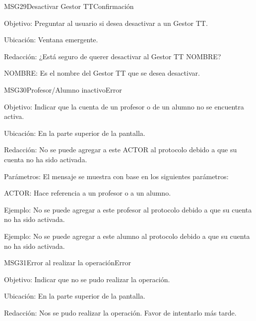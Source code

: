 \begin{mensaje}{MSG29}{Desactivar Gestor TT}{Confirmación}
	\item[Objetivo:] Preguntar al usuario si desea desactivar a un Gestor TT.
    \item[Ubicación:] Ventana emergente.
    \item[Redacción:] ¿Está seguro de querer desactivar al Gestor TT NOMBRE?
    \begin{Citemize}
	   	\item NOMBRE: Es el nombre del Gestor TT que se desea desactivar.
	\end{Citemize}
\end{mensaje}

\begin{mensaje}{MSG30}{Profesor/Alumno inactivo}{Error}
	\item[Objetivo:] Indicar que la cuenta de un profesor o de un alumno no se encuentra activa.
	\item[Ubicación:] En la parte superior de la pantalla.
	\item[Redacción:] No se puede agregar a este ACTOR al protocolo debido a que su cuenta no ha sido activada.
	\item[Parámetros:] El mensaje se muestra con base en los siguientes parámetros:
	\begin{Citemize}
		\item ACTOR: Hace referencia a un profesor o a un alumno.
	\end{Citemize}
	\item[Ejemplo:] No se puede agregar a este profesor al protocolo debido a que su cuenta no ha sido activada.
	\item[Ejemplo:] No se puede agregar a este alumno al protocolo debido a que su cuenta no ha sido activada.
	
	
\end{mensaje}

\begin{mensaje}{MSG31}{Error al realizar la operación}{Error}
	\item[Objetivo:] Indicar que no se pudo realizar la operación.
	\item[Ubicación:] En la parte superior de la pantalla.
	\item[Redacción:] Nos se pudo realizar la operación. Favor de intentarlo más tarde.
\end{mensaje}

